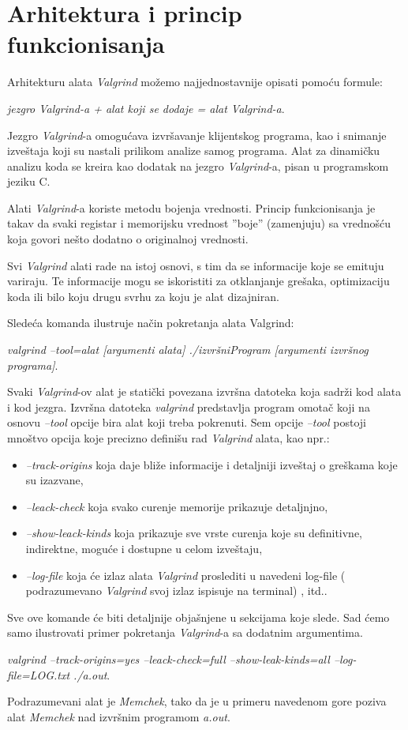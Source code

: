 \documentclass[12pt,oneside]{memoir}
\theoremstyle{plain}
\theoremstyle{definition}
\begin{document}
\section{Arhitektura i princip funkcionisanja}
Arhitekturu alata \textit{Valgrind} možemo najjednostavnije opisati pomoću formule:
\begin{center}
\textit{jezgro Valgrind-a + alat koji se dodaje = alat Valgrind-a}.
\end{center}

Jezgro \textit{Valgrind}-a omogućava izvršavanje klijentskog programa, kao i snimanje izveštaja koji su nastali prilikom analize samog programa. Alat za dinamičku analizu koda se kreira kao dodatak na jezgro \textit{Valgrind}-a, pisan u programskom jeziku C.

Alati \textit{Valgrind}-a koriste metodu bojenja vrednosti. Princip funkcionisanja je takav da svaki registar i memorijsku vrednost ''boje'' (zamenjuju) sa vrednošću koja govori nešto dodatno o originalnoj vrednosti.

Svi \textit{Valgrind} alati rade na istoj osnovi, s tim da se informacije koje se emituju variraju. Te informacije mogu se iskoristiti za otklanjanje grešaka, optimizaciju koda ili bilo koju drugu svrhu za koju je alat dizajniran.

Sledeća komanda ilustruje način pokretanja alata Valgrind:
\begin{center}
\textit{valgrind --tool=alat [argumenti alata] ./izvršniProgram [argumenti izvršnog programa]}.
\end{center}

Svaki \textit{Valgrind}-ov alat je statički povezana izvršna datoteka koja sadrži kod alata i kod jezgra. Izvršna datoteka \textit{valgrind} predstavlja program omotač koji na osnovu \textit{--tool} opcije bira alat koji treba pokrenuti. Sem opcije \textit{–tool} postoji mnoštvo opcija koje precizno definišu rad \textit{Valgrind} alata, kao npr.:
\begin{itemize}
\item \textit{--track-origins} koja daje bliže informacije i detaljniji izveštaj o greškama koje su izazvane, 
\item \textit{--leack-check} koja svako curenje memorije prikazuje detaljnjno,
\item \textit{--show-leack-kinds} koja prikazuje sve vrste curenja koje su definitivne, indirektne, moguće i dostupne u celom izveštaju,
\item \textit{--log-file}  koja će izlaz alata \textit{Valgrind} proslediti u navedeni log-file ( podrazumevano \textit{Valgrind} svoj izlaz ispisuje na terminal) , itd.. 
\end{itemize} 
Sve ove komande će biti detaljnije objašnjene u sekcijama koje slede. Sad ćemo samo ilustrovati primer pokretanja \textit{Valgrind}-a sa dodatnim argumentima.
\begin{center}
\textit{valgrind --track-origins=yes --leack-check=full --show-leak-kinds=all --log-file=LOG.txt ./a.out}.
\end{center}
Podrazumevani alat je \textit{Memchek}, tako da je u primeru navedenom gore poziva alat \textit{Memchek} nad izvršnim programom \textit{a.out}.
\end{document}
